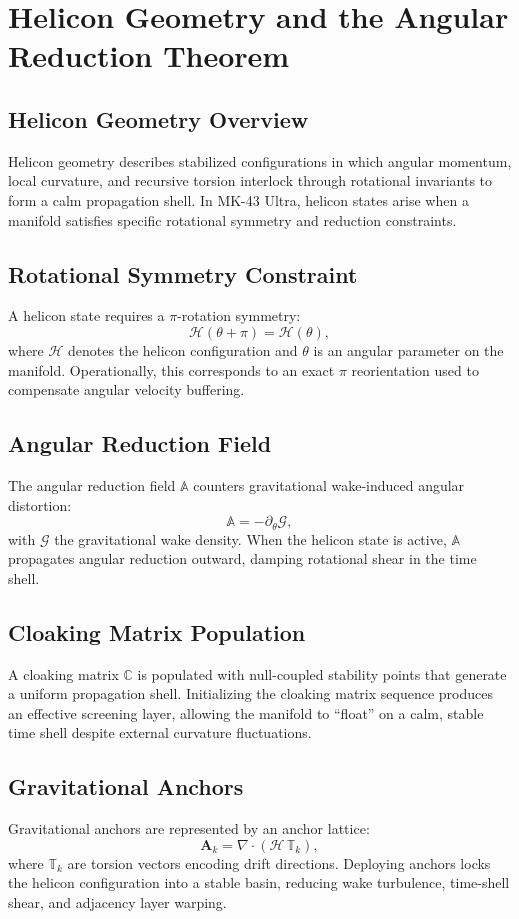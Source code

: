 
\chapter{Helicon Geometry and the Angular Reduction Theorem}

\section{Helicon Geometry Overview}
Helicon geometry describes stabilized configurations in which angular momentum, local curvature, and recursive torsion interlock through rotational invariants to form a calm propagation shell. In MK-43 Ultra, helicon states arise when a manifold satisfies specific rotational symmetry and reduction constraints.

\section{Rotational Symmetry Constraint}
A helicon state requires a $\pi$-rotation symmetry:
\[
\mathscr{H}(\theta + \pi) = \mathscr{H}(\theta),
\]
where $\mathscr{H}$ denotes the helicon configuration and $\theta$ is an angular parameter on the manifold. Operationally, this corresponds to an exact $\pi$ reorientation used to compensate angular velocity buffering.

\section{Angular Reduction Field}
The angular reduction field $\mathbb{A}$ counters gravitational wake-induced angular distortion:
\[
\mathbb{A} = -\partial_\theta \mathscr{G},
\]
with $\mathscr{G}$ the gravitational wake density. When the helicon state is active, $\mathbb{A}$ propagates angular reduction outward, damping rotational shear in the time shell.

\section{Cloaking Matrix Population}
A cloaking matrix $\mathbb{C}$ is populated with null-coupled stability points that generate a uniform propagation shell. Initializing the cloaking matrix sequence produces an effective screening layer, allowing the manifold to ``float'' on a calm, stable time shell despite external curvature fluctuations.

\section{Gravitational Anchors}
Gravitational anchors are represented by an anchor lattice:
\[
\mathbf{A}_k = \nabla \cdot (\mathscr{H}\,\mathbb{T}_k),
\]
where $\mathbb{T}_k$ are torsion vectors encoding drift directions. Deploying anchors locks the helicon configuration into a stable basin, reducing wake turbulence, time-shell shear, and adjacency layer warping.

